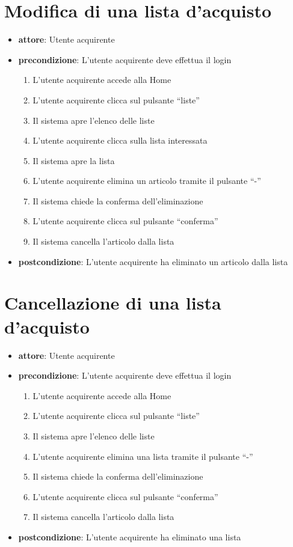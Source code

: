 \section{Modifica di una lista d’acquisto}
\begin{itemize}
    \item \textbf{attore}: Utente acquirente
    \item \textbf{precondizione}: L’utente acquirente deve effettua il login
    
    \begin{enumerate}
        \item L’utente acquirente accede alla Home
        \item L’utente acquirente clicca sul pulsante “liste”
        \item Il sistema apre l’elenco delle liste
        \item L’utente acquirente clicca sulla lista interessata
        \item Il sistema apre la lista 
        \item L’utente acquirente elimina un articolo tramite il pulsante “-”
        \item Il sistema chiede la conferma dell’eliminazione
        \item L’utente acquirente clicca sul pulsante “conferma”
        \item Il sistema cancella l’articolo dalla lista
    \end{enumerate}
    
    \item \textbf{postcondizione}: L’utente acquirente ha eliminato un articolo dalla lista
\end{itemize}


\section{Cancellazione di una lista d’acquisto}
\begin{itemize}
    \item \textbf{attore}: Utente acquirente
    \item \textbf{precondizione}: L’utente acquirente deve effettua il login
    
    \begin{enumerate}
        \item L’utente acquirente accede alla Home
        \item L’utente acquirente clicca sul pulsante “liste”
        \item Il sistema apre l’elenco delle liste
        \item L’utente acquirente elimina una lista tramite il pulsante “-”
        \item Il sistema chiede la conferma dell’eliminazione
        \item L’utente acquirente clicca sul pulsante “conferma”
        \item Il sistema cancella l’articolo dalla lista
    \end{enumerate}

    \item \textbf{postcondizione}: L’utente acquirente ha eliminato una lista
\end{itemize}
		

